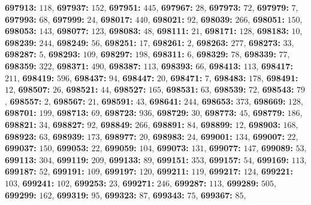 \textsf{\bfseries 697913:} $118$, \textsf{\bfseries 697937:} $152$, \textsf{\bfseries 697951:} $445$, \textsf{\bfseries 697967:} $28$, \textsf{\bfseries 697973:} $72$, \textsf{\bfseries 697979:} $7$, \textsf{\bfseries 697993:} $68$, \textsf{\bfseries 697999:} $24$, \textsf{\bfseries 698017:} $440$, \textsf{\bfseries 698021:} $92$, \textsf{\bfseries 698039:} $266$, \textsf{\bfseries 698051:} $150$, \textsf{\bfseries 698053:} $143$, \textsf{\bfseries 698077:} $123$, \textsf{\bfseries 698083:} $48$, \textsf{\bfseries 698111:} $21$, \textsf{\bfseries 698171:} $128$, \textsf{\bfseries 698183:} $10$, \textsf{\bfseries 698239:} $244$, \textsf{\bfseries 698249:} $56$, \textsf{\bfseries 698251:} $17$, \textsf{\bfseries 698261:} $2$, \textsf{\bfseries 698263:} $277$, \textsf{\bfseries 698273:} $33$, \textsf{\bfseries 698287:} $5$, \textsf{\bfseries 698293:} $109$, \textsf{\bfseries 698297:} $198$, \textsf{\bfseries 698311:} $6$, \textsf{\bfseries 698329:} $78$, \textsf{\bfseries 698339:} $77$, \textsf{\bfseries 698359:} $322$, \textsf{\bfseries 698371:} $490$, \textsf{\bfseries 698387:} $113$, \textsf{\bfseries 698393:} $66$, \textsf{\bfseries 698413:} $113$, \textsf{\bfseries 698417:} $211$, \textsf{\bfseries 698419:} $596$, \textsf{\bfseries 698437:} $94$, \textsf{\bfseries 698447:} $20$, \textsf{\bfseries 698471:} $7$, \textsf{\bfseries 698483:} $178$, \textsf{\bfseries 698491:} $12$, \textsf{\bfseries 698507:} $26$, \textsf{\bfseries 698521:} $44$, \textsf{\bfseries 698527:} $165$, \textsf{\bfseries 698531:} $63$, \textsf{\bfseries 698539:} $72$, \textsf{\bfseries 698543:} $79$, \textsf{\bfseries 698557:} $2$, \textsf{\bfseries 698567:} $21$, \textsf{\bfseries 698591:} $43$, \textsf{\bfseries 698641:} $244$, \textsf{\bfseries 698653:} $373$, \textsf{\bfseries 698669:} $128$, \textsf{\bfseries 698701:} $199$, \textsf{\bfseries 698713:} $69$, \textsf{\bfseries 698723:} $936$, \textsf{\bfseries 698729:} $30$, \textsf{\bfseries 698773:} $45$, \textsf{\bfseries 698779:} $186$, \textsf{\bfseries 698821:} $34$, \textsf{\bfseries 698827:} $92$, \textsf{\bfseries 698849:} $266$, \textsf{\bfseries 698891:} $84$, \textsf{\bfseries 698899:} $12$, \textsf{\bfseries 698903:} $168$, \textsf{\bfseries 698923:} $63$, \textsf{\bfseries 698939:} $173$, \textsf{\bfseries 698977:} $20$, \textsf{\bfseries 698983:} $24$, \textsf{\bfseries 699001:} $134$, \textsf{\bfseries 699007:} $22$, \textsf{\bfseries 699037:} $150$, \textsf{\bfseries 699053:} $22$, \textsf{\bfseries 699059:} $104$, \textsf{\bfseries 699073:} $131$, \textsf{\bfseries 699077:} $147$, \textsf{\bfseries 699089:} $53$, \textsf{\bfseries 699113:} $304$, \textsf{\bfseries 699119:} $209$, \textsf{\bfseries 699133:} $89$, \textsf{\bfseries 699151:} $353$, \textsf{\bfseries 699157:} $54$, \textsf{\bfseries 699169:} $113$, \textsf{\bfseries 699187:} $52$, \textsf{\bfseries 699191:} $109$, \textsf{\bfseries 699197:} $120$, \textsf{\bfseries 699211:} $119$, \textsf{\bfseries 699217:} $124$, \textsf{\bfseries 699221:} $103$, \textsf{\bfseries 699241:} $102$, \textsf{\bfseries 699253:} $23$, \textsf{\bfseries 699271:} $246$, \textsf{\bfseries 699287:} $113$, \textsf{\bfseries 699289:} $505$, \textsf{\bfseries 699299:} $162$, \textsf{\bfseries 699319:} $95$, \textsf{\bfseries 699323:} $87$, \textsf{\bfseries 699343:} $75$, \textsf{\bfseries 699367:} $85$, 
